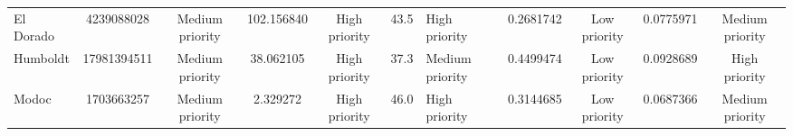 \documentclass[
]{article}
\begin{document}
\begin{table}
{\begin{tabular}[t]{lccccclcccc}
El Dorado & 4239088028 & Medium priority & 102.156840 & High priority & 43.5 & High priority & 0.2681742 & Low priority & 0.0775971 & Medium priority\\
Humboldt & 17981394511 & Medium priority & 38.062105 & High priority & 37.3 & Medium priority & 0.4499474 & Low priority & 0.0928689 & High priority\\
Modoc & 1703663257 & Medium priority & 2.329272 & High priority & 46.0 & High priority & 0.3144685 & Low priority & 0.0687366 & Medium priority\\
\bottomrule
\end{tabular}}
\end{table}
\end{document}
